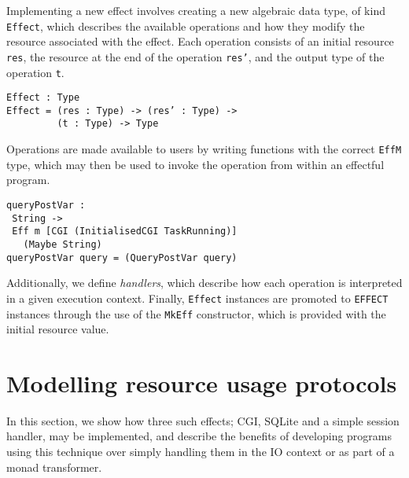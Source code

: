 \documentclass[preprint]{sigplanconf}
\begin{document}
Implementing a new effect involves creating a new algebraic data type, of kind \texttt{Effect}, which describes the available operations and how they modify the resource associated with the effect. Each operation consists of an initial resource \texttt{res}, the resource at the end of the operation \texttt{res'}, and the output type of the operation \texttt{t}.
{\small
\begin{verbatim}
Effect : Type
Effect = (res : Type) -> (res’ : Type) ->
         (t : Type) -> Type
\end{verbatim}
}
Operations are made available to users by writing functions with the correct \texttt{EffM} type, which may then be used to invoke the operation from within an effectful program.
{\small
\begin{verbatim}
queryPostVar : 
 String -> 
 Eff m [CGI (InitialisedCGI TaskRunning)] 
   (Maybe String)
queryPostVar query = (QueryPostVar query)
\end{verbatim}
}
Additionally, we define \textit{handlers}, which describe how each operation is interpreted in a given execution context. Finally, \texttt{Effect} instances are promoted to \texttt{EFFECT} instances through the use of the \texttt{MkEff} constructor, which is provided with the initial resource value.


\section{Modelling resource usage protocols}
In this section, we show how three such effects; CGI, SQLite and a simple session handler, may be implemented, and describe the benefits of developing programs using this technique over simply handling them in the IO context or as part of a monad transformer.

\end{document}
